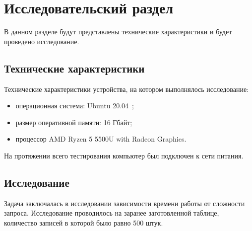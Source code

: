 \chapter{Исследовательский раздел}

В данном разделе будут представлены технические характеристики и будет проведено исследование.

\section{Технические характеристики}
Технические характеристики устройства, на котором выполнялось исследование:
\begin{itemize}
	\item операционная система: Ubuntu 20.04~\cite{ubuntu};
	\item размер оперативной памяти: 16 Гбайт;
	\item процессор AMD Ryzen 5 5500U with Radeon Graphics.
\end{itemize}
	
На протяжении всего тестирования компьютер был подключен к сети питания.
\section{Исследование}
Задача заключалась в исследовании зависимости времени работы от сложности запроса.
Исследование проводилось на заранее заготовленной таблице, количество записей в которой было равно 500 штук.

